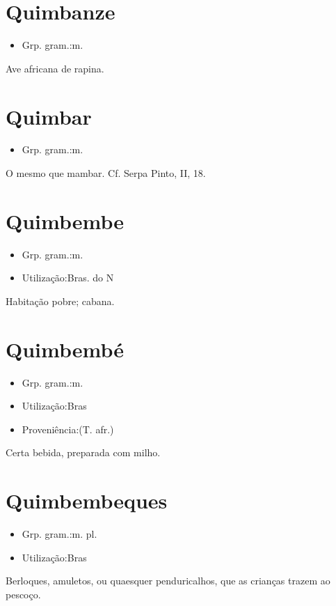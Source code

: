 \section{Quimbanze}
\begin{itemize}
\item {Grp. gram.:m.}
\end{itemize}
Ave africana de rapina.
\section{Quimbar}
\begin{itemize}
\item {Grp. gram.:m.}
\end{itemize}
O mesmo que \textunderscore mambar\textunderscore . Cf. Serpa Pinto, II, 18.
\section{Quimbembe}
\begin{itemize}
\item {Grp. gram.:m.}
\end{itemize}
\begin{itemize}
\item {Utilização:Bras. do N}
\end{itemize}
Habitação pobre; cabana.
\section{Quimbembé}
\begin{itemize}
\item {Grp. gram.:m.}
\end{itemize}
\begin{itemize}
\item {Utilização:Bras}
\end{itemize}
\begin{itemize}
\item {Proveniência:(T. afr.)}
\end{itemize}
Certa bebida, preparada com milho.
\section{Quimbembeques}
\begin{itemize}
\item {Grp. gram.:m. pl.}
\end{itemize}
\begin{itemize}
\item {Utilização:Bras}
\end{itemize}
Berloques, amuletos, ou quaesquer penduricalhos, que as crianças trazem ao pescoço.
